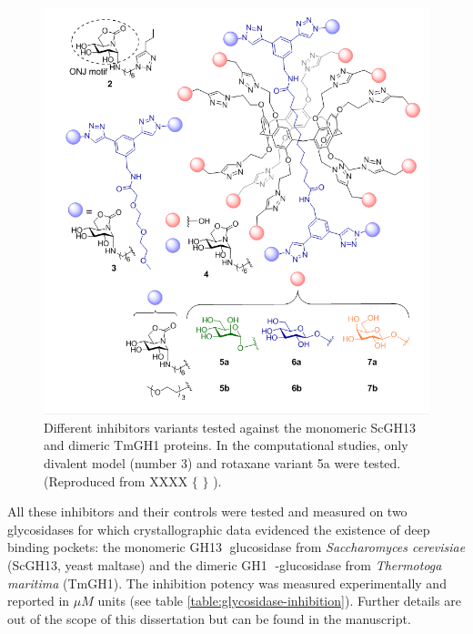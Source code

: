 
\begin{figure}[H] %
	\begin{Center}
		\includegraphics[width=\textwidth]{./figures/06/glyco-inhibitors.png}
	\end{Center}
	\cprotect\caption[Tested inhibitors against ScGH13 and TmGH1]{Different inhibitors variants tested against the monomeric ScGH13 and dimeric TmGH1 proteins. In the computational studies, only divalent model (number 3) and rotaxane variant 5a were tested. (Reproduced from XXXX $ \{ $ $ \} $ ).} %
	\label{fig:rotaxane-compounds}
\end{figure}



All these inhibitors and their controls were tested and measured on two glycosidases for which crystallographic data evidenced the existence of deep binding pockets: the monomeric GH13 glucosidase from \textit{Saccharomyces cerevisiae} (ScGH13, yeast maltase) and the dimeric GH1 -glucosidase from \textit{Thermotoga maritima} (TmGH1). The inhibition potency was measured experimentally and reported in $ \mu M $ units (see table \ref{table:glycosidase-inhibition}). Further details are out of the scope of this dissertation but can be found in the manuscript.


